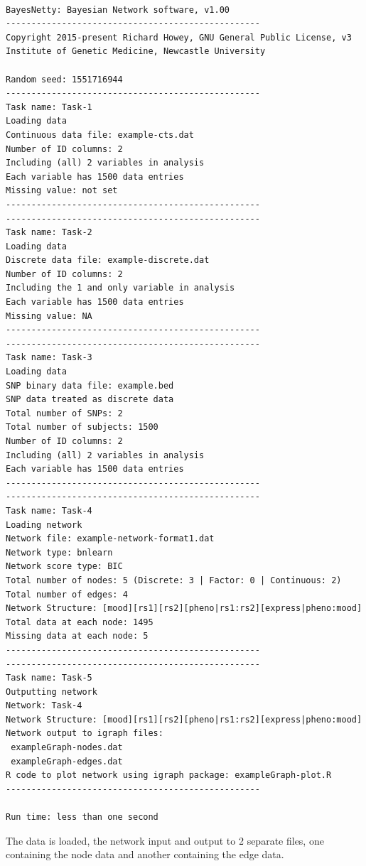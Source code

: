 \documentclass[a4paper,12pt]{article}
\begin{document}
\vspace{0.35cm} \begin{lstlisting}

BayesNetty: Bayesian Network software, v1.00
--------------------------------------------------
Copyright 2015-present Richard Howey, GNU General Public License, v3
Institute of Genetic Medicine, Newcastle University

Random seed: 1551716944
--------------------------------------------------
Task name: Task-1
Loading data
Continuous data file: example-cts.dat
Number of ID columns: 2
Including (all) 2 variables in analysis
Each variable has 1500 data entries
Missing value: not set
--------------------------------------------------
--------------------------------------------------
Task name: Task-2
Loading data
Discrete data file: example-discrete.dat
Number of ID columns: 2
Including the 1 and only variable in analysis
Each variable has 1500 data entries
Missing value: NA
--------------------------------------------------
--------------------------------------------------
Task name: Task-3
Loading data
SNP binary data file: example.bed
SNP data treated as discrete data
Total number of SNPs: 2
Total number of subjects: 1500
Number of ID columns: 2
Including (all) 2 variables in analysis
Each variable has 1500 data entries
--------------------------------------------------
--------------------------------------------------
Task name: Task-4
Loading network
Network file: example-network-format1.dat
Network type: bnlearn
Network score type: BIC
Total number of nodes: 5 (Discrete: 3 | Factor: 0 | Continuous: 2)
Total number of edges: 4
Network Structure: [mood][rs1][rs2][pheno|rs1:rs2][express|pheno:mood]
Total data at each node: 1495
Missing data at each node: 5
--------------------------------------------------
--------------------------------------------------
Task name: Task-5
Outputting network
Network: Task-4
Network Structure: [mood][rs1][rs2][pheno|rs1:rs2][express|pheno:mood]
Network output to igraph files:
 exampleGraph-nodes.dat
 exampleGraph-edges.dat
R code to plot network using igraph package: exampleGraph-plot.R
--------------------------------------------------

Run time: less than one second

\end{lstlisting} \vspace{0.35cm}
The data is loaded, the network input and output to 2 separate files, one containing the node data and another containing the edge data. 
\end{document}
